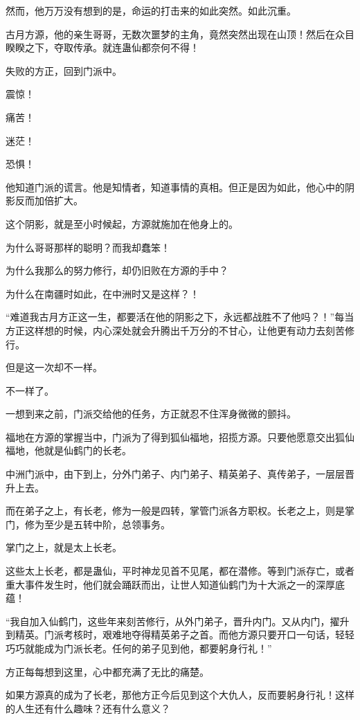 \begin{this_body}
然而，他万万没有想到的是，命运的打击来的如此突然。如此沉重。

古月方源，他的亲生哥哥，无数次噩梦的主角，竟然突然出现在山顶！然后在众目睽睽之下，夺取传承。就连蛊仙都奈何不得！

失败的方正，回到门派中。

震惊！

痛苦！

迷茫！

恐惧！

他知道门派的谎言。他是知情者，知道事情的真相。但正是因为如此，他心中的阴影反而加倍扩大。

这个阴影，就是至小时候起，方源就施加在他身上的。

为什么哥哥那样的聪明？而我却蠢笨！

为什么我那么的努力修行，却仍旧败在方源的手中？

为什么在南疆时如此，在中洲时又是这样？！

“难道我古月方正这一生，都要活在他的阴影之下，永远都战胜不了他吗？！”每当方正这样想的时候，内心深处就会升腾出千万分的不甘心，让他更有动力去刻苦修行。

但是这一次却不一样。

不一样了。

一想到来之前，门派交给他的任务，方正就忍不住浑身微微的颤抖。

福地在方源的掌握当中，门派为了得到狐仙福地，招揽方源。只要他愿意交出狐仙福地，他就是仙鹤门的长老。

中洲门派中，由下到上，分外门弟子、内门弟子、精英弟子、真传弟子，一层层晋升上去。

而在弟子之上，有长老，修为一般是四转，掌管门派各方职权。长老之上，则是掌门，修为至少是五转中阶，总领事务。

掌门之上，就是太上长老。

这些太上长老，都是蛊仙，平时神龙见首不见尾，都在潜修。等到门派存亡，或者重大事件发生时，他们就会踊跃而出，让世人知道仙鹤门为十大派之一的深厚底蕴！

“我自加入仙鹤门，这些年来刻苦修行，从外门弟子，晋升内门。又从内门，擢升到精英。门派考核时，艰难地夺得精英弟子之首。而他方源只要开口一句话，轻轻巧巧就能成为门派长老。任何的弟子见到他，都要躬身行礼！”

方正每每想到这里，心中都充满了无比的痛楚。

如果方源真的成为了长老，那他方正今后见到这个大仇人，反而要躬身行礼！这样的人生还有什么趣味？还有什么意义？


\end{this_body}
